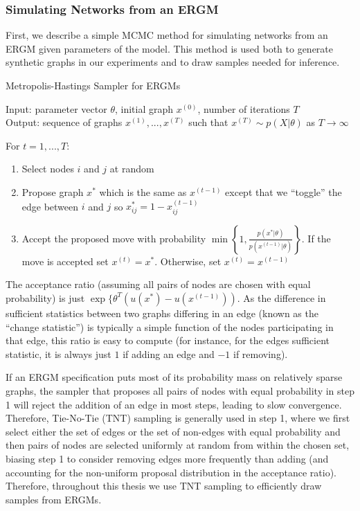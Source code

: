 \subsubsection{Simulating Networks from an ERGM}

First, we describe a simple MCMC method for simulating networks from an ERGM given parameters of the model. This method is used both to generate synthetic graphs in our experiments and to draw samples needed for inference.

\begin{algorithm}[!ht]
	\caption{Metropolis-Hastings Sampler for ERGMs}
	Input: parameter vector $\theta$, initial graph $x^{(0)}$, number of iterations $T$ \\
	Output: sequence of graphs $x^{(1)},...,x^{(T)}$ such that $x^{(T)} \sim p(X | \theta)$ as $T \to \infty$
	
	\vspace{0.1in}
	For {$ t = 1,...,T$}:
	\begin{enumerate}
		\item  Select nodes $i$ and $j$ at random
		\item Propose graph $x^*$ which is the same as $x^{(t-1)}$ except that we ``toggle'' the edge between $i$ and $j$ so $x^*_{ij} = 1 - x^{(t-1)}_{ij}$
		\item Accept the proposed move with probability $\min\left\{1, \frac{p(x^* | \theta)}{p(x^{(t-1)} | \theta)} \right\}$. If the move is accepted set $x^{(t)} = x^*$. Otherwise, set $x^{(t)} = x^{(t-1)}$
	\end{enumerate}
\end{algorithm}

The acceptance ratio (assuming all pairs of nodes are chosen with equal probability) is just $ \exp \{\theta^T(u(x^*) - u(x^{(t-1)}))$. As the difference in sufficient statistics between two graphs differing in an edge (known as the ``change statistic'') is typically a simple function of the nodes participating in that edge, this ratio is easy to compute (for instance, for the edges sufficient statistic, it is always just $1$ if adding an edge and $-1$ if removing). 

 If an ERGM specification puts most of its probability mass on relatively sparse graphs, the sampler that proposes all pairs of nodes with equal probability in step 1 will reject the addition of an edge in most steps, leading to slow convergence. Therefore, Tie-No-Tie (TNT) sampling is generally used in step 1, where we first select either the set of edges or the set of non-edges with equal probability and then pairs of nodes are selected uniformly at random from within the chosen set, biasing step 1 to consider removing edges more frequently than adding (and accounting for the non-uniform proposal distribution in the acceptance ratio). Therefore, throughout this thesis we use TNT sampling to efficiently draw samples from ERGMs.

